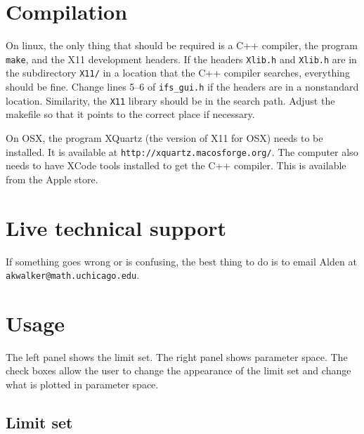 \documentclass{amsart}
\begin{document}
\section{Compilation}

On linux, the only thing that should be required is a C++ compiler, the 
program \texttt{make}, and the X11 development headers.  
If the headers \texttt{Xlib.h} and \texttt{Xlib.h} are in 
the subdirectory \texttt{X11/} in a location that the C++ compiler 
searches, everything should be fine.  Change lines 5--6 of \verb|ifs_gui.h|
if the headers are in a nonstandard location.  Similarity, the \texttt{X11}
library should be in the search path.  Adjust the makefile so that it 
points to the correct place if necessary.

On OSX, the program XQuartz (the version of X11 for OSX) needs to be installed.
It is available at \texttt{http://xquartz.macosforge.org/}.  
The computer also needs to have XCode tools installed to get the 
C++ compiler.  This is available from the Apple store.

\section{Live technical support}

If something goes wrong or is confusing, the best thing to 
do is to email Alden at \texttt{akwalker@math.uchicago.edu}.

\section{Usage}

The left panel shows the limit set.  The right panel shows parameter space.  
The check boxes allow the user to change the appearance of the limit set 
and change what is plotted in parameter space.

\subsection{Limit set}
\end{document}
